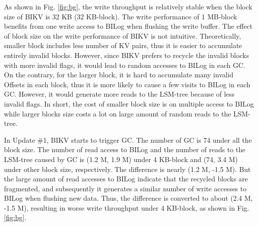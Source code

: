 \documentclass[sigconf]{acmart}
\begin{document}
As shown in Fig. \ref{fig:bg}, the write throughput is relatively stable when the block size of BIKV is 32 KB (32 KB-block). The write performance of 1 MB-block benefits from one write access to BILog when flushing the write buffer. The effect of block size on the write performance of BIKV is not intuitive. Theoretically, smaller block includes less number of KV pairs, thus it is easier to accumulate entirely invalid blocks. However, since BIKV prefers to recycle the invalid blocks with more invalid flags, it would lead to random accesses to BILog in each GC. On the contrary, for the larger block, it is hard to accumulate many invalid Offsets in each block, thus it is more likely to cause a few visits to BILog in each GC. However, it would generate more reads to the LSM-tree because of less invalid flags. In short, the cost of smaller block size is on multiple access to BILog while larger blocks size costs a lot on large amount of random reads to the LSM-tree.

In Update \#1, BIKV starts to trigger GC. The number of GC is 74 under all the block size. The number of read access to BILog and the number of reads to the LSM-tree caused by GC is (1.2 M, 1.9 M) under 4 KB-block and (74, 3.4 M) under other block size, respectively. The difference is nearly (1.2 M, -1.5 M). But the large amount of read accesses to BILog indicate that the recycled blocks are fragmented, and subsequently it generates a similar number of write accesses to BILog when flushing new data. Thus, the difference is converted to about (2.4 M, -1.5 M), resulting in worse write throughput under 4 KB-block, as shown in Fig. \ref{fig:bg}.
\end{document}
